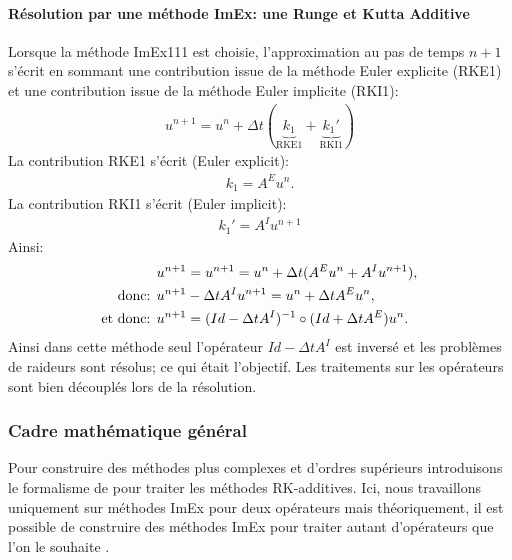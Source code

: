     \paragraph{Résolution par une méthode ImEx: une Runge et Kutta Additive}
            Lorsque la méthode ImEx111 est choisie,
            l’approximation au pas de temps $n+1$ s'écrit en sommant une contribution issue de la méthode Euler explicite (RKE1)
            et une contribution issue de la méthode Euler implicite (RKI1):
            \begin{align}
                u^{n+1} = u^n + \Delta t (\underbrace{k_1}_{\text{RKE1}} + \underbrace{k_1'}_{\text{RKI1}})
            \end{align}
            La contribution RKE1 s'écrit (Euler explicit):
            \begin{align}
                k_1 = A^E u^n.
            \end{align}
            La contribution RKI1 s'écrit (Euler implicit):
            \begin{align}
                k_1' = A^I u^{n+1}
            \end{align}
            Ainsi: 
            \begin{align}
                &u^{n+1} = u^{n+1} = u^n + \Delta t ( A^E u^n +  A^I u^{n+1}),\\\notag
                \text{donc: }&u^{n+1} - \Delta t  A^I u^{n+1} = u^n + \Delta t  A^E u^n,\\\notag
                \text{et donc: }&u^{n+1} = (Id - \Delta t A^I)^{-1} \circ (Id + \Delta t A^E) u^n.
            \end{align}
            Ainsi dans cette méthode seul l’opérateur $Id- \Delta t A^I$ est inversé et les problèmes de raideurs sont résolus;
            ce qui était l’objectif. Les traitements sur les opérateurs sont bien découplés lors de la résolution.
\subsubsection{Cadre mathématique général}
    Pour construire des méthodes plus complexes et d'ordres supérieurs introduisons le formalisme de \cite{ASCHER1997151} pour traiter les méthodes RK-additives. 
    Ici, nous travaillons uniquement sur méthodes ImEx pour deux opérateurs mais théoriquement, il est possible de construire des méthodes ImEx pour traiter 
    autant d'opérateurs que l'on le souhaite \cite{KENNEDY2003139}.
